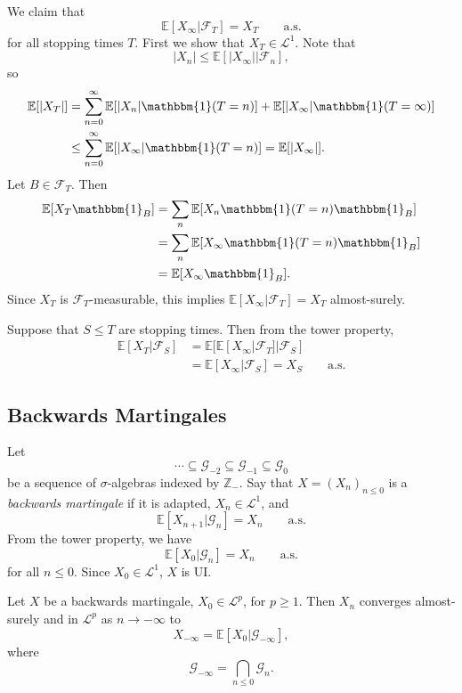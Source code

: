 \documentclass[12pt]{article}
\begin{document}
\begin{proofbox}
	We claim that
	\[
		\mathbb{E}[X_\infty | \mathcal{F}_T] = X_T \qquad \text{a.s.}
	\]
	for all stopping times $T$. First we show that $X_T \in \mathcal{L}^1$. Note that
	\[
	|X_n| \leq \mathbb{E}[|X_\infty| | \mathcal{F}_n],
	\]
	so
	\begin{align*}
		\mathbb{E}[|X_T|] &= \sum_{n = 0}^{\infty} \mathbb{E}[|X_n| \mathbbm{1}(T=n)] + \mathbb{E}[|X_\infty| \mathbbm{1}(T = \infty)] \\
				  &\leq \sum_{n = 0}^{\infty} \mathbb{E}[|X_\infty| \mathbbm{1}(T=n)] = \mathbb{E}[|X_\infty|].
	\end{align*}
	Let $B \in \mathcal{F}_T$. Then
	\begin{align*}
		\mathbb{E}[X_T \mathbbm{1}_{B}] &= \sum_n \mathbb{E}[X_n \mathbbm{1}(T = n) \mathbbm{1}_{B}] \\
						&= \sum_n \mathbb{E}[X_\infty \mathbbm{1}(T = n) \mathbbm{1}_{B}] \\
						&= \mathbb{E}[X_\infty \mathbbm{1}_{B}].
	\end{align*}
	Since $X_T$ is $\mathcal{F}_T$-measurable, this implies $\mathbb{E}[X_\infty | \mathcal{F}_T] = X_T$ almost-surely.

	Suppose that $S \leq T$ are stopping times. Then from the tower property,
	\begin{align*}
		\mathbb{E}[X_T |\mathcal{F}_S] &= \mathbb{E}[ \mathbb{E}[X_\infty | \mathcal{F}_T] | \mathcal{F}_S] \\
					       &= \mathbb{E}[X_\infty | \mathcal{F}_S] = X_S \qquad \text{a.s.}
	\end{align*}
\end{proofbox}

\subsection{Backwards Martingales}%
\label{sub:bms}

Let
\[
\cdots \subseteq \mathcal{G}_{-2} \subseteq \mathcal{G}_{-1} \subseteq \mathcal{G}_0
\]
be a sequence of $\sigma$-algebras indexed by $\mathbb{Z}_-$. Say that $X = (X_n)_{n \leq 0}$ is a \emph{backwards martingale} if it is adapted, $X_n \in \mathcal{L}^1$, and
\[
	\mathbb{E}[X_{n+1} | \mathcal{G}_n] = X_n \qquad \text{a.s.}
\]
From the tower property, we have
\[
	\mathbb{E}[X_0 | \mathcal{G}_n] = X_n \qquad \text{a.s.}
\]
for all $n \leq 0$. Since $X_0 \in \mathcal{L^1}$, $X$ is UI.

\begin{theorem}
	Let $X$ be a backwards martingale, $X_0 \in \mathcal{L}^p$, for $p \geq 1$. Then $X_n$ converges almost-surely and in $\mathcal{L}^p$ as $n \to -\infty$ to
	\[
	X_{-\infty} = \mathbb{E}[X_0 | \mathcal{G}_{-\infty}],
	\]
	where
	\[
	\mathcal{G}_{-\infty} = \bigcap_{n \leq 0} \mathcal{G}_n.
	\]
\end{theorem}
\end{document}
